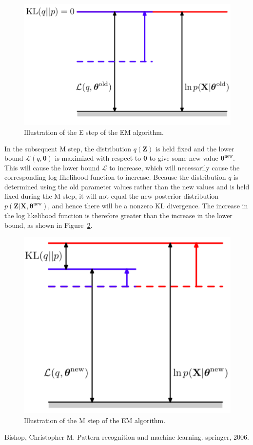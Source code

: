 \documentclass[5p,sort&compress]{elsarticle}
\begin{document}
\begin{figure}[ht]
     \centering
     \includegraphics[width = 0.8\linewidth]{figure/figure9_12.png}
     \caption{Illustration of the E step of the EM algorithm.}
     \label{fig:9_12}
\end{figure}

In the subsequent M step, the distribution $q(\mathbf{Z})$ is held fixed and the lower bound $\mathcal{L}(q, \boldsymbol{\theta})$ is maximized with respect to $\boldsymbol{\theta}$ to give some new value $\boldsymbol{\theta}^{\mathrm{new}}$. This will cause the lower bound $\mathcal{L}$ to increase, which will necessarily cause the corresponding log likelihood function to increase. Because the distribution $q$ is determined using the old parameter values rather than the new values and is held fixed during the M step, it will not equal the new posterior distribution $p(\mathbf{Z}|\mathbf{X}, \boldsymbol{\theta}^{\mathrm{new}})$, and hence there will be a nonzero KL divergence. The increase in the log likelihood function is therefore greater than the increase in the lower bound, as shown in Figure~\ref{fig:9_13}.

\begin{figure}[ht]
     \centering
     \includegraphics[width = 0.8\linewidth]{figure/figure9_13.png}
     \caption{Illustration of the M step of the EM algorithm.}
     \label{fig:9_13}
\end{figure}






\begin{thebibliography}{9}

Bishop, Christopher M. Pattern recognition and machine learning. springer, 2006.


\end{thebibliography}
\end{document}
